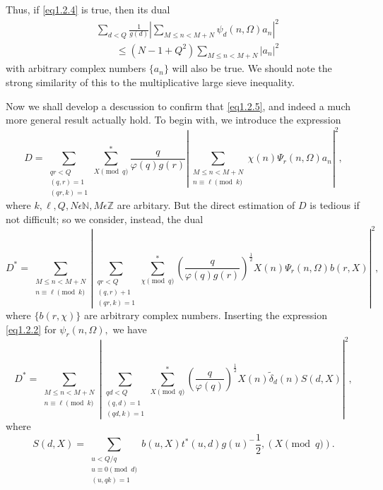  Thus, if \eqref{eq1.2.4} is true, then its dual
\begin{equation*}
\begin{split}
& \sum_{d<Q} \frac{1}{g(d)}| \sum_{M\leq n<M+N} \psi _d (n,\Omega)a_n |^2\\
&\qquad \leq (N-1+Q^2)\sum_{M\leq n<M+N }| a_n|^2 
\end{split}
\tag{1.2.5}\label{eq1.2.5}
\end{equation*}
with arbitrary complex numbers $\{a_n\}$ will also be true. We should
note the strong similarity of this to the multiplicative large sieve
inequality. 
 
 Now we shall develop a descussion to confirm that
 \eqref{eq1.2.5}, and indeed a much more general result actually
 hold. To begin with, we introduce the expression  
 $$
 D=\sum_{\substack{qr<Q\\ (q,r)=1\\ (qr,k)=1}} \sum^*
 _{X \pmod{q}}\frac{q}{\varphi(q)g(r)}| \sum_{\substack{M\leq
     n<M+N \\ n \equiv \ell \pmod{k}}} \chi(n)\Psi_r(n,\Omega)
 a_n |^2, 
 $$\pageoriginale
 where $k, \ell, Q, N \epsilon \mathbb{N}, M \epsilon \mathbb{Z}
 $  are arbitary. But the direct estimation of $D$ is tedious if not
 difficult; so we consider, instead, the dual 
  $$
 D^*=\sum_{\substack{M\leq n< M+N \\ n \equiv \ell \pmod{k}}}|
 \sum_{\substack{qr<Q\\ (q,r)+1 \\ (qr,k)=1}}
 \sum^*_{\chi \pmod{q}}\left(\frac{q}{\varphi (q)g(r)}\right)^\frac{1}{2}
 X(n)\Psi _r(n,\Omega)b(r,X)|^2, 
 $$
 where $\{b(r,\chi)\}$ are arbitrary complex numbers. Inserting
 the expression \eqref{eq1.2.2} for $\psi_r(n,\Omega),$ we have 
 $$
 D^*=\sum_{\substack{M\leq n< M+N \\ n \equiv \ell \pmod{k}}}|
 \sum_{\substack{qd<Q\\ (q,d)=1 \\ (qd,k)=1}} \sum^*_{X
   \pmod{q}}\left(\frac{q}{\varphi(q)}\right)^\frac{1}{2}
 X(n)\tilde{\delta}_d (n)S(d,X)|^2, 
 $$
 where
\begin{equation*}
  S(d,X)=\sum_{\substack{u<Q/q \\ u\equiv 0\pmod{d}\\ (u,qk)=1}}
  b(u, X)t^*(u,d)
  g(u)^-\frac{1}{2},(X\pmod{q}). \tag{1.2.6} \label{eq1.2.6} 
\end{equation*}
 

